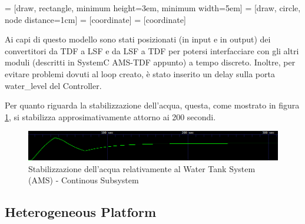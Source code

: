 \documentclass[]{IEEEtran}
\begin{document}
 = [draw, rectangle, minimum height=3em, minimum width=5em]
 = [draw, circle, node distance=1cm]
 = [coordinate]
 = [coordinate]

Ai capi di questo modello sono stati posizionati (in input e in output) dei convertitori da TDF a LSF e da LSF a TDF per
potersi interfacciare con gli altri moduli (descritti in SystemC AMS-TDF appunto) a tempo discreto.
Inoltre, per evitare problemi dovuti al loop creato, \`e stato inserito un delay sulla porta water\_level del Controller.

Per quanto riguarda la stabilizzazione dell'acqua, questa, come mostrato in figura \ref{fig:water_continuous_system}, 
si stabilizza approsimativamente attorno ai 200 secondi.
\begin{figure}[t]
	\centering
	\includegraphics[width=0.95\columnwidth]{figures/water_level_continuous_subsystem.png}
	\caption{Stabilizzazione dell'acqua relativamente al Water Tank System (AMS) - Continous Subsystem}
	\label{fig:water_continuous_system}
\end{figure}

\subsection{Heterogeneous Platform}
\end{document}
